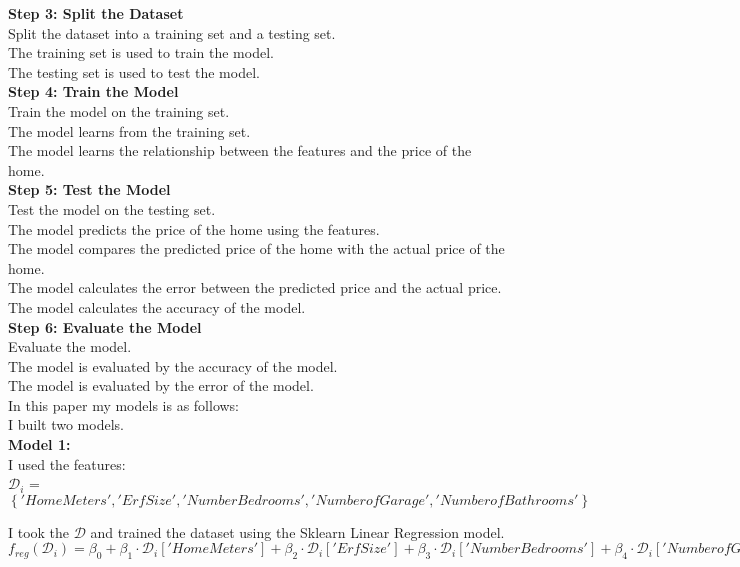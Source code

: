 \textbf{Step 3: Split the Dataset} \\
Split the dataset into a training set and a testing set. \\
The training set is used to train the model. \\
The testing set is used to test the model. \\

\textbf{Step 4: Train the Model} \\
Train the model on the training set. \\
The model learns from the training set. \\
The model learns the relationship between the features and the price of the home. \\

\textbf{Step 5: Test the Model} \\
Test the model on the testing set. \\
The model predicts the price of the home using the features. \\
The model compares the predicted price of the home with the actual price of the home. \\
The model calculates the error between the predicted price and the actual price. \\
The model calculates the accuracy of the model. \\

\textbf{Step 6: Evaluate the Model} \\
Evaluate the model. \\
The model is evaluated by the accuracy of the model. \\
The model is evaluated by the error of the model. \\

In this paper my models is as follows: \\
I built two models. \\

\textbf{Model 1:} \\
I used the features: \\
$\mathcal{D}_i$ = $\left\{'Home Meters','Erf Size','Number Bedrooms','Number of Garage','Number of Bathrooms'\right\} $

I took the $\mathcal{D}$ and trained the dataset using the Sklearn Linear Regression model. 
\\ $f_{reg}(\mathcal{D}_i) = \beta_0 + \beta_1 \cdot \mathcal{D}_i['Home Meters'] + \beta_2 \cdot \mathcal{D}_i['Erf Size'] + \beta_3 \cdot \mathcal{D}_i['Number Bedrooms'] + \beta_4 \cdot \mathcal{D}_i['Number of Garage'] + \beta_5 \cdot \mathcal{D}_i['Number of Bathrooms']$

